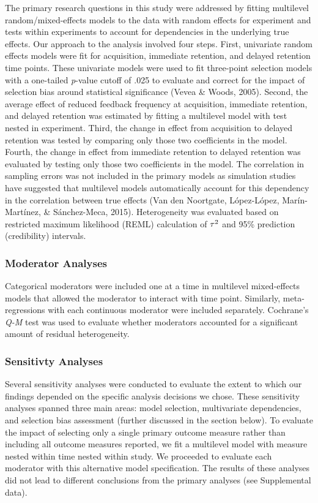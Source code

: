 \documentclass[
  english,
  man, donotrepeattitle,floatsintext]{apa7}
\begin{document}
The primary research questions in this study were addressed by fitting multilevel random/mixed-effects models to the data with random effects for experiment and tests within experiments to account for dependencies in the underlying true effects. Our approach to the analysis involved four steps. First, univariate random effects models were fit for acquisition, immediate retention, and delayed retention time points. These univariate models were used to fit three-point selection models with a one-tailed \emph{p}-value cutoff of .025 to evaluate and correct for the impact of selection bias around statistical significance (Vevea \& Woods, 2005). Second, the average effect of reduced feedback frequency at acquisition, immediate retention, and delayed retention was estimated by fitting a multilevel model with test nested in experiment. Third, the change in effect from acquisition to delayed retention was tested by comparing only those two coefficients in the model. Fourth, the change in effect from immediate retention to delayed retention was evaluated by testing only those two coefficients in the model. The correlation in sampling errors was not included in the primary models as simulation studies have suggested that multilevel models automatically account for this dependency in the correlation between true effects (Van den Noortgate, López-López, Marín-Martínez, \& Sánchez-Meca, 2015). Heterogeneity was evaluated based on restricted maximum likelihood (REML) calculation of \(\small\tau^2\) and 95\% prediction (credibility) intervals.

\hypertarget{moderator-analyses}{%
\subsubsection{Moderator Analyses}\label{moderator-analyses}}

Categorical moderators were included one at a time in multilevel mixed-effects models that allowed the moderator to interact with time point. Similarly, meta-regressions with each continuous moderator were included separately. Cochrane's \emph{Q-M} test was used to evaluate whether moderators accounted for a significant amount of residual heterogeneity.

\hypertarget{sensitivty-analyses}{%
\subsubsection{Sensitivty Analyses}\label{sensitivty-analyses}}

Several sensitivity analyses were conducted to evaluate the extent to which our findings depended on the specific analysis decisions we chose. These sensitivity analyses spanned three main areas: model selection, multivariate dependencies, and selection bias assessment (further discussed in the section below). To evaluate the impact of selecting only a single primary outcome measure rather than including all outcome measures reported, we fit a multilevel model with measure nested within time nested within study. We proceeded to evaluate each moderator with this alternative model specification. The results of these analyses did not lead to different conclusions from the primary analyses (see Supplemental data).
\end{document}
